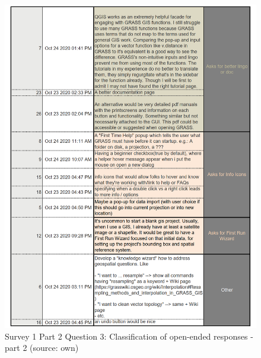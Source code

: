 \documentclass[a4paper,10pt,twoside]{article}
\begin{document}
\newpage
\vspace{0.3cm}
\begin{figure}[hbt!] 
\begin{center}
\includegraphics[width=16.5cm]{../surveys/analyzed_data/survey1_part2_question3_open_ended-2_3} 
\caption[Survey 1 Part 2 Question 3: Classification of open-ended responses - part 2]{Survey 1 Part 2 Question 3: Classification of open-ended responses - part 2 (source: own)}
\label{fig:survey1_part2_question3_open_ended-2_1}
\end{center}
\end{figure}
\end{document}
